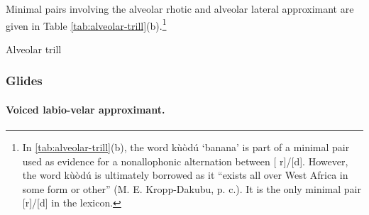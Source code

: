   
Minimal pairs involving the alveolar rhotic and alveolar lateral approximant are 
given in Table \ref{tab:alveolar-trill}(b).\footnote{In 
\ref{tab:alveolar-trill}(b), the word {\sls kùòdú} `banana' is part of a 
minimal pair used as evidence for a  nonallophonic alternation between [{
r}]/[{d}]. However, the word {\sls kùòdú} is ultimately borrowed as it 
``exists all over West Africa in some form or other''  (M. E. Kropp-Dakubu, p. 
c.). It is the only minimal pair  [{r}]/[{d}] in the lexicon.}


 
\begin{table} 


\caption{Alveolar trill\label{tab:alveolar-trill}}
\quad
{}


\end{table}


\subsubsection{Glides}
\label{sec:approx-glide}

\paragraph{Voiced labio-velar approximant.}
\label{par:labio-velar-approximant}

